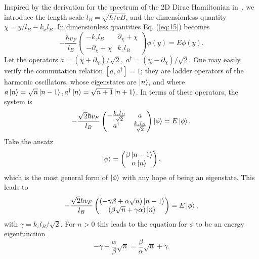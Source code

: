 Inspired by the derivation for the spectrum of the 2D Dirac Hamiltonian in~\cite{wehlingDiracMaterials2014}, we introduce the length scale $l_B = \sqrt{\hbar / eB}$, and the dimensionless quantity $\chi = y /l_{B} - k_x l_{B}$.
In dimensionless quantities Eq. (\ref{eq:15}) becomes
\begin{equation}
  -\frac{{\hbar v_F}}{l_{B}}
  \begin{pmatrix}
    -k_z l_B & \partial _{\chi } + \chi \\
    -\partial _{\chi } + \chi & k_z l_B
  \end{pmatrix}
  \phi(y)  =  E \phi(y).
\end{equation}
Let the operators \(a = \left( \chi + \partial _{\chi } \right) / \sqrt{2},\; a^{\dagger} = \left( \chi - \partial _{\chi } \right) /\sqrt{2}\).
One may easily verify the commutation relation $[a, a^{\dagger}] = 1$;
they are ladder operators of the harmonic oscillators, whose eigenstates are $\ket{n}$, and where $a\ket{n} = \sqrt{n}\ket{n-1}, a^{\dagger} \ket{n} = \sqrt{n+1} \ket{n+1}$.
In terms of these operators, the system is
\begin{equation}
  -\frac{\sqrt{2} \hbar v_F}{l_B}
  \begin{pmatrix}
    -\frac{k_zl_B}{\sqrt{2}} & a\\
    a^{\dagger} & \frac{k_zl_B}{\sqrt{2}}
  \end{pmatrix}
  \ket{\phi } = E \ket{\phi }.
\end{equation}
Take the ansatz
\begin{equation}
  \ket{\phi } =
  \begin{pmatrix}
    \beta \ket{n-1}\\
    \alpha  \ket{n}
  \end{pmatrix},
\end{equation}
which is the most general form of $\ket{\phi }$ with any hope of being an eigenstate.
This leads to
\begin{equation}
  -\frac{\sqrt{2} \hbar v_F}{l_B}
  \begin{pmatrix}
    \left( -\gamma \beta + \alpha \sqrt{n} \right) \ket{n-1}\\
    \left( \beta \sqrt{n} + \gamma \alpha \right) \ket{n}
  \end{pmatrix}
  = E \ket{\phi },
\end{equation}
with $\gamma  = k_zl_B / \sqrt{2}$.
For $n > 0$ this leads to the equation for $\phi $ to be an energy eigenfunction
\begin{equation}
  -\gamma + \frac{\alpha}{\beta } \sqrt{n} = \frac{\beta }{\alpha } \sqrt{n} + \gamma.
\end{equation}
